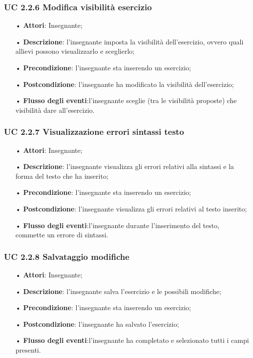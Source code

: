 \subsubsection{UC 2.2.6 Modifica visibilità esercizio}
\begin{itemize}
	\item[•] \textbf{Attori}: Insegnante;
	\item[•] \textbf{Descrizione}: l'insegnante imposta la visibilità dell'esercizio, ovvero quali allievi possono visualizzarlo e sceglierlo;
	\item[•] \textbf{Precondizione}: l'insegnante sta inserendo un esercizio;
	\item[•] \textbf{Postcondizione}: l'insegnante ha modificato la visibilità dell'esercizio;
	\item[•] \textbf{Flusso degli eventi}:l'insegnante sceglie (tra le visibilità proposte) che visibilità dare all'esercizio.
\end{itemize}

\subsubsection{UC 2.2.7 Visualizzazione errori sintassi testo}
\begin{itemize}
	\item[•] \textbf{Attori}: Insegnante;
	\item[•] \textbf{Descrizione}: l'insegnante visualizza gli errori relativi alla sintassi e la forma del testo che ha inserito;
	\item[•] \textbf{Precondizione}: l'insegnante sta inserendo un esercizio;
	\item[•] \textbf{Postcondizione}: l’insegnante visualizza gli errori relativi al testo inserito;
	\item[•] \textbf{Flusso degli eventi}:l'insegnante durante l'inserimento del testo, commette un errore di sintassi.
\end{itemize}

\subsubsection{UC 2.2.8 Salvataggio modifiche}
\begin{itemize}
	\item[•] \textbf{Attori}: Insegnante;
	\item[•] \textbf{Descrizione}: l'insegnante salva l'esercizio e le possibili modifiche;
	\item[•] \textbf{Precondizione}: l'insegnante sta inserendo un esercizio;
	\item[•] \textbf{Postcondizione}: l'insegnante ha salvato l'esercizio;
	\item[•] \textbf{Flusso degli eventi}:l'insegnante ha completato e selezionato tutti i campi presenti.
\end{itemize}

